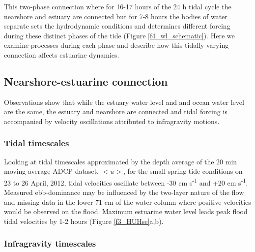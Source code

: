 This two-phase connection where for 16-17 hours of the 24 h tidal
cycle the nearshore and estuary are connected but for 7-8 hours the
bodies of water separate sets the hydrodynamic conditions and determines
different forcing during these distinct phases of the tide (Figure
\ref{f4_wl_schematic}). Here we examine processes during each phase
and describe how this tidally varying connection affects estuarine
dynamics. 


\subsection{Nearshore-estuarine connection}

Observations show that while the estuary water level and and ocean
water level are the same, the estuary and nearshore are connected
and tidal forcing is accompanied by velocity oscillations attributed
to infragravity motions. 


\subsubsection{Tidal timescales}

Looking at tidal timescales approximated by the depth average of the
20 min moving average ADCP dataset, $\overline{<u>}$, for the small
spring tide conditions on 23 to 26 April, 2012, tidal velocities oscillate
between -30 cm s\textsuperscript{-1} and +20 cm s\textsuperscript{-1}.
Measured ebb-dominance may be influenced by the two-layer nature of
the flow and missing data in the lower 71 cm of the water column where
positive velocities would be observed on the flood. Maximum estuarine
water level leads peak flood tidal velocities by 1-2 hours (Figure
\ref{f3_HUHse}a,b). 


\subsubsection{Infragravity timescales}


